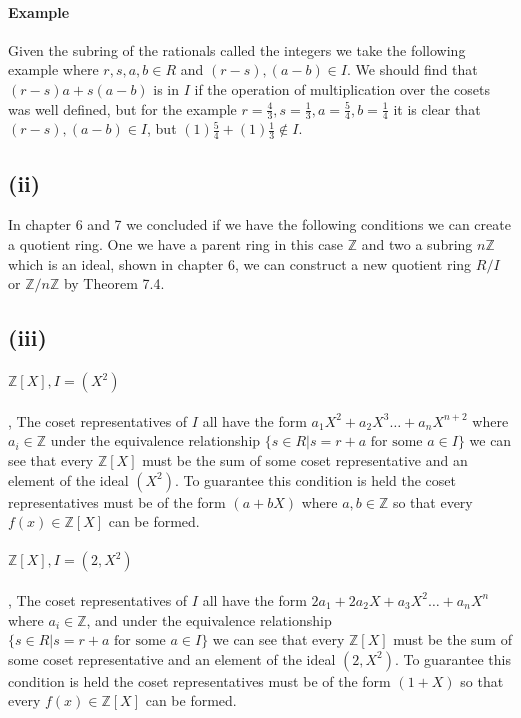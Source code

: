 \documentclass{article}
\begin{document}
      \paragraph{Example} Given the subring of the rationals called the integers we take the following example where $r,s,a,b \in R$ and $(r-s), (a-b) \in I$. We should find that $(r - s)a + s(a - b)$ is in $I$ if the operation of multiplication over the cosets was well defined, but for the example $r = \frac{4}{3}, s = \frac{1}{3}, a = \frac{5}{4}, b = \frac{1}{4}$ it is clear that $(r-s), (a-b)\in I$, but $(1)\frac{5}{4} + (1)\frac{1}{3} \notin I$.

    \subsection*{(ii)}
      In chapter 6 and 7 we concluded if we have the following conditions we can create a quotient ring. One we have a parent ring in this case $\mathbb{Z}$ and two a subring $n\mathbb{Z}$ which is an ideal, shown in chapter 6, we can construct a new quotient ring $R/I$ or $\mathbb{Z}/n\mathbb{Z}$ by Theorem 7.4.

    \subsection*{(iii)}
      \paragraph{$\mathbb{Z}[X], I = (X^2)$}, The coset representatives of $I$ all have the form $a_1X^2 + a_2X^3 \dots + a_nX^{n+2}$ where $a_i \in \mathbb{Z}$  under the equivalence relationship $\{s \in R | s = r + a \text{ for some } a \in I\}$ we can see that every $\mathbb{Z}[X]$ must be the sum of some coset representative and an element of the ideal $(X^2)$. To guarantee this condition is held the coset representatives must be of the form $(a+bX)$ where $a,b \in \mathbb{Z}$ so that every $f(x) \in \mathbb{Z}[X]$ can be formed.

      \paragraph{$\mathbb{Z}[X], I = (2, X^2)$}, The coset representatives of $I$ all have the form $2a_1 + 2a_2X + a_3X^2 \dots + a_nX^{n}$ where $a_i \in \mathbb{Z}$, and under the equivalence relationship $\{s \in R | s = r + a \text{ for some } a \in I\}$ we can see that every $\mathbb{Z}[X]$ must be the sum of some coset representative and an element of the ideal $(2, X^2)$. To guarantee this condition is held the coset representatives must be of the form $(1+X)$ so that every $f(x) \in \mathbb{Z}[X]$ can be formed.
\end{document}
